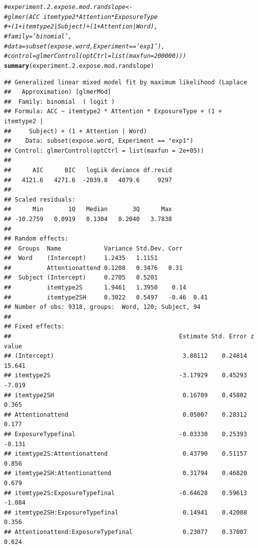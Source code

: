 \documentclass[11pt]{article}\usepackage[]{graphicx}\usepackage[]{color}
\makeatletter
\newcommand{\hlcom}[1]{\textcolor[rgb]{0.678,0.584,0.686}{\textit{#1}}}%
\newcommand{\hlstd}[1]{\textcolor[rgb]{0.345,0.345,0.345}{#1}}%
\newcommand{\hlkwd}[1]{\textcolor[rgb]{0.737,0.353,0.396}{\textbf{#1}}}%
\newenvironment{kframe}{%
 \def\at@end@of@kframe{}%
 \ifinner\ifhmode%
  \def\at@end@of@kframe{\end{minipage}}%
  \begin{minipage}{\columnwidth}%
 \fi\fi%
 \def\FrameCommand##1{\hskip\@totalleftmargin \hskip-\fboxsep
 \colorbox{shadecolor}{##1}\hskip-\fboxsep
     \hskip-\linewidth \hskip-\@totalleftmargin \hskip\columnwidth}%
 \MakeFramed {\advance\hsize-\width
   \@totalleftmargin\z@ \linewidth\hsize
   \@setminipage}}%
 {\par\unskip\endMakeFramed%
 \at@end@of@kframe}
\newenvironment{knitrout}{}{} %
\makeatother
\begin{document}
\begin{knitrout}\footnotesize
{}\color{fgcolor}\begin{kframe}
\begin{alltt}
 \hlcom{#experiment.2.expose.mod.randslope <- }
 \hlcom{#glmer(ACC ~ itemtype2*Attention*ExposureType }
 \hlcom{#+ (1+itemtype2|Subject) + (1+Attention|Word),}
 \hlcom{#family='binomial',}
 \hlcom{#data = subset(expose.word, Experiment == 'exp1'),}
 \hlcom{#control = glmerControl(optCtrl = list(maxfun = 200000) ))}
  \hlkwd{summary}\hlstd{(experiment.2.expose.mod.randslope)}
\end{alltt}
\begin{verbatim}
## Generalized linear mixed model fit by maximum likelihood (Laplace
##   Approximation) [glmerMod]
##  Family: binomial  ( logit )
## Formula: ACC ~ itemtype2 * Attention * ExposureType + (1 + itemtype2 |  
##     Subject) + (1 + Attention | Word)
##    Data: subset(expose.word, Experiment == "exp1")
## Control: glmerControl(optCtrl = list(maxfun = 2e+05))
## 
##      AIC      BIC   logLik deviance df.resid 
##   4121.6   4271.6  -2039.8   4079.6     9297 
## 
## Scaled residuals: 
##      Min       1Q   Median       3Q      Max 
## -10.2759   0.0919   0.1304   0.2040   3.7838 
## 
## Random effects:
##  Groups  Name            Variance Std.Dev. Corr       
##  Word    (Intercept)     1.2435   1.1151              
##          Attentionattend 0.1208   0.3476   0.31       
##  Subject (Intercept)     0.2705   0.5201              
##          itemtype2S      1.9461   1.3950    0.14      
##          itemtype2SH     0.3022   0.5497   -0.46  0.41
## Number of obs: 9318, groups:  Word, 120; Subject, 94
## 
## Fixed effects:
##                                               Estimate Std. Error z value
## (Intercept)                                    3.88112    0.24814  15.641
## itemtype2S                                    -3.17929    0.45293  -7.019
## itemtype2SH                                    0.16709    0.45802   0.365
## Attentionattend                                0.05007    0.28312   0.177
## ExposureTypefinal                             -0.03330    0.25393  -0.131
## itemtype2S:Attentionattend                     0.43790    0.51157   0.856
## itemtype2SH:Attentionattend                    0.31794    0.46820   0.679
## itemtype2S:ExposureTypefinal                  -0.64628    0.59613  -1.084
## itemtype2SH:ExposureTypefinal                  0.14941    0.42008   0.356
## Attentionattend:ExposureTypefinal              0.23077    0.37007   0.624

\end{verbatim}
\end{kframe}
\end{knitrout}
\end{document}
